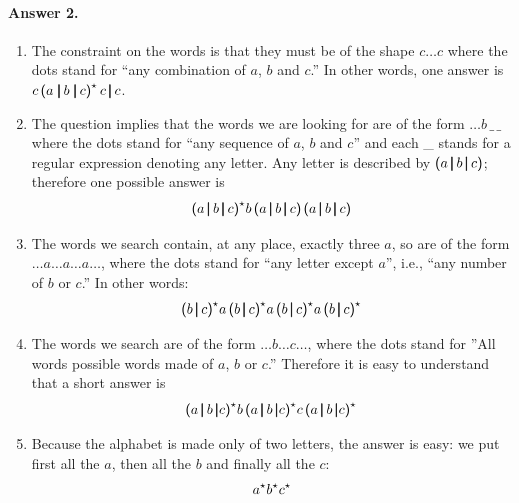 \paragraph{Answer 2.}

\begin{enumerate}

  \item The constraint on the words is that they must be of the shape
    \(c \ldots c\) where the dots stand for ``any combination of
    \(a\), \(b\) and \(c\).'' In other words, one answer is \(c \,
    \textsf{(} a \; \pmb{\lvert}{} \, b \; \pmb{\lvert}{} \, c\textsf{)}^{\star} \, c \,
    \pmb{\lvert} \, c\).

  \item The question implies that the words we are looking for are of
    the form \(\ldots b \, \_ \, \_\) where the dots stand for ``any
    sequence of \(a\), \(b\) and \(c\)'' and each \_ stands for a
    regular expression denoting any letter. Any letter is described by
    \(\textsf{(} a \, \pmb{\lvert}{} \, b \, \pmb{\lvert}{} \, c\textsf{)}\); therefore
    one possible answer is \[\textsf{(} a \, \pmb{\lvert}{} \, b \, \pmb{\lvert}{} \,
    c\textsf{)}^{\star}{} b \, \textsf{(} a \, \pmb{\lvert}{} \, b \, \pmb{\lvert}{} \,
    c\textsf{)} \, \textsf{(} a \, \pmb{\lvert}{} \, b \, \pmb{\lvert}{} \,c\textsf{)}\]

  \item The words we search contain, at any place, exactly three
    \(a\), so are of the form \(\ldots a \ldots a \ldots a \ldots\),
    where the dots stand for ``any letter except \(a\)'', i.e., ``any
    number of \(b\) or \(c\).'' In other words: \[\textsf{(} b \,
    \pmb{\lvert}{} \, c\textsf{)}^{\star}{} a \, \textsf{(} b \, \pmb{\lvert}{} \,
    c\textsf{)}^{\star}{} a \, \textsf{(} b \, \pmb{\lvert}{} \,
    c\textsf{)}^{\star}{} a \, \textsf{(} b \, \pmb{\lvert}{} \,
    c\textsf{)}^{\star}\]

  \item The words we search are of the form \(\ldots b \ldots
      c \ldots\), where the dots stand for ''All words possible words
      made of \(a\), \(b\) or \(c\).'' Therefore it is easy to
      understand that a short answer is \[\textsf{(} a \, \pmb{\lvert}{} \, b
      \, \pmb{\lvert}{} c\textsf{)}^{\star}{} b \, \textsf{(} a \, \pmb{\lvert}{} \, b
      \, \pmb{\lvert}{} c\textsf{)}^{\star}{} c \, \textsf{(} a \, \pmb{\lvert}{} \, b
      \, \pmb{\lvert}{} c\textsf{)}^{\star}\]

    \item Because the alphabet is made only of two letters, the
      answer is easy: we put first all the \(a\), then all the
      \(b\) and finally all the \(c\): \[a^{\star} b^{\star}
      c^{\star}\]

  \end{enumerate}
